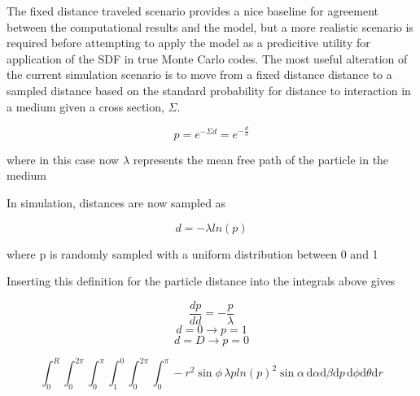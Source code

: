 
The fixed distance traveled scenario provides a nice baseline for agreement
between the computational results and the model, but a more realistic scenario
is required before attempting to apply the model as a predicitive utility for
application of the SDF in true Monte Carlo codes. The most useful alteration of
the current simulation scenario is to move from a fixed distance distance to a
sampled distance based on the standard probability for distance to interaction
in a medium given a cross section, $\Sigma$.

$$ p = e^{-\Sigma d} = e^{-\frac{d}{\lambda}} $$

where in this case now $\lambda$ represents the mean free path of the particle in the medium

In simulation, distances are now sampled as

$$ d = -\lambda ln(p) $$

where p is randomly sampled with a uniform distribution between 0 and 1

Inserting this definition for the particle distance into the integrals above
gives

$$ \frac{dp}{dd} = -\frac{p}{\lambda} $$
$$ d = 0 \rightarrow p = 1 $$
$$ d = D \rightarrow p = 0 $$

$$ \int_{0}^{R}\int_{0}^{2\pi}\int_{0}^{\pi}\int_{1}^{0}\int_{0}^{2\pi}\int_{0}^{\pi}
-r^2\sin{\phi} \, \lambda p ln(p)^2 \sin{\alpha} \, \mathrm{d}\alpha \mathrm{d}\beta \mathrm{d}p \, \mathrm{d}\phi
\mathrm{d}\theta \mathrm{d}r $$

